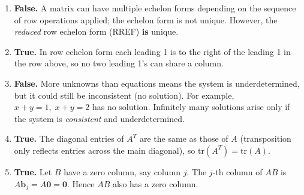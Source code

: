 \documentclass[12pt,a3paper]{article}
\begin{document}
\begin{tcolorbox}[enhanced,breakable,
  colback=cA!4,colframe=cA,boxrule=0.8pt,arc=5pt,
  title={\textbf{Answer --- True/False: Matrix \& Linear System Properties}},
  fonttitle=\bfseries\color{white},colbacktitle=cA]
 
\begin{enumerate}[label=\textbf{(\roman*)}]
 
  \item \textbf{False.} A matrix can have multiple echelon forms depending on the
  sequence of row operations applied; the echelon form is not unique. However,
  the \emph{reduced} row echelon form (RREF) \textbf{is} unique.
 
  \item \textbf{True.} In row echelon form each leading 1 is to the right of the
  leading 1 in the row above, so no two leading 1's can share a column.
 
  \item \textbf{False.} More unknowns than equations means the system is
  underdetermined, but it could still be inconsistent (no solution). For example,
  $x + y = 1,\; x + y = 2$ has no solution. Infinitely many solutions arise
  only if the system is \emph{consistent} and underdetermined.
 
  \item \textbf{True.} The diagonal entries of $A^T$ are the same as those of $A$
  (transposition only reflects entries across the main diagonal), so
  $\mathrm{tr}(A^T) = \mathrm{tr}(A)$.
 
  \item \textbf{True.} Let $B$ have a zero column, say column $j$.
  The $j$-th column of $AB$ is $A\mathbf{b}_j = A\mathbf{0} = \mathbf{0}$.
  Hence $AB$ also has a zero column.
 
\end{enumerate}
\end{tcolorbox}
 
\end{document}
